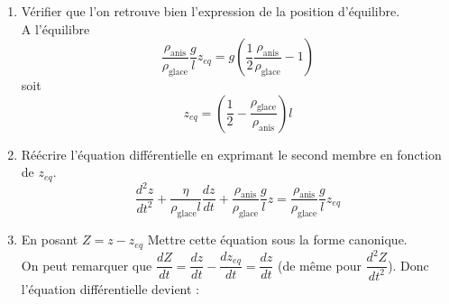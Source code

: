 \documentclass[a4paper,10pt,notitlepage,oneside]{article}
\theoremstyle{plain}
\begin{document}
\begin{enumerate}
    Le PFD donne 
    \begin{equation*}
        \rho_{\text{glace}}l^2L\dfrac{d^2z}{dt^2} = - \rho_{\text{glace}}l^2Lg+\rho_{\text{anis}}Llg\left(\dfrac{l}{2}-z\right)-\eta Ll\dfrac{dz}{dt}
    \end{equation*}
    Ce qui, après manipulation, donne
    \begin{equation*}
    \boxed{
       \dfrac{d^2z}{dt^2} +\dfrac{\eta}{ \rho_{\text{glace}}l}\dfrac{dz}{dt}+\dfrac{\rho_{\text{anis}}}{\rho_{\text{glace}}}\dfrac{g}{l}z= g\left(\dfrac{1}{2}\dfrac{\rho_{\text{anis}}}{\rho_{\text{glace}}}-1\right)
       }
    \end{equation*}
    
    
    \item Vérifier que l'on retrouve bien l'expression de la position d'équilibre.\\

    A l'équilibre
    \begin{equation*}
       \dfrac{\rho_{\text{anis}}}{\rho_{\text{glace}}}\dfrac{g}{l}z_{eq}= g\left(\dfrac{1}{2}\dfrac{\rho_{\text{anis}}}{\rho_{\text{glace}}}-1\right)
    \end{equation*}
    soit 
    \begin{equation*}
        \boxed{
        z_{eq} = \left(\dfrac{1}{2}-\dfrac{\rho_{\text{glace}}}{\rho_{\text{anis}}}\right)l
        }
    \end{equation*}
    \item Réécrire l'équation différentielle en exprimant le second membre en fonction de $z_{eq}$.\\

    
    \begin{equation*}
    \boxed{
       \dfrac{d^2z}{dt^2} +\dfrac{\eta}{ \rho_{\text{glace}}l}\dfrac{dz}{dt}+\dfrac{\rho_{\text{anis}}}{\rho_{\text{glace}}}\dfrac{g}{l}z= \dfrac{\rho_{\text{anis}}}{\rho_{\text{glace}}}\dfrac{g}{l}z_{eq}
       }
    \end{equation*}
    
    \item En posant $Z = z-z_{eq}$ Mettre cette équation sous la forme canonique.\\

    On peut remarquer que $\dfrac{dZ}{dt} = \dfrac{dz}{dt}-\dfrac{dz_{eq}}{dt} = \dfrac{dz}{dt}$ (de même pour $\dfrac{d^2Z}{dt^2}$). Donc l'équation différentielle devient :
    

\end{enumerate}
\end{document}
